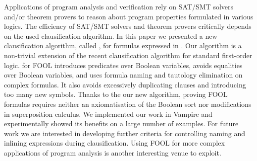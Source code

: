 
Applications of program analysis and verification rely on SAT/SMT solvers and/or
theorem provers to reason about program properties formulated in various logics.
The efficiency of SAT/SMT solvers and theorem provers critically depends on the used clausification algorithm. 
In this paper we presented a new clausification algorithm, called \nfcnf{}, for formulas expressed in \folb{}. 
Our algorithm is a non-trivial extension of the recent \newcnf{} clausification
algorithm for standard first-order logic.  \nfcnf{} for FOOL    
introduces \Skolem{} predicates over Boolean variables, avoids equalities over
Boolean variables, and uses formula naming and tautology elimination on complex
formulas. 
It also avoids excessively duplicating clauses and introducing too many new
symbols. 
Thanks to the our new  \nfcnf{}  algorithm, proving FOOL formulas requires neither an
axiomatisation of 
the Boolean sort nor modifications in superposition calculus. 
We implemented our work in Vampire and
experimentally showed its benefits on a large number of examples.  
For future work we are interested in developing further criteria for
controlling naming and inlining expressions during clausification. Using FOOL
for more complex applications of program analysis is another interesting venue to
exploit.



